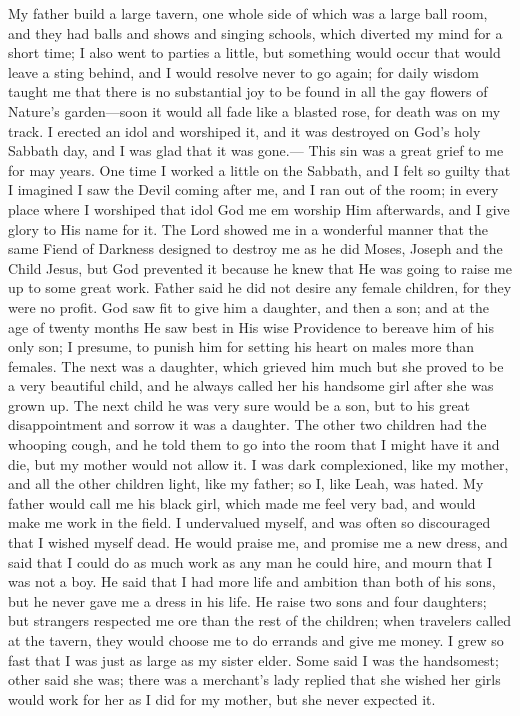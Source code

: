 \documentclass{article}
\renewcommand\footnote[1]{} %
\begin{document}
My father build a large tavern, one whole side of which was a large ball room, and they had balls and shows and singing schools, which diverted my mind for a short time; I also went to parties a little, but something would occur that would leave a sting behind, and I would resolve never to go again; for daily wisdom taught me that there is no substantial joy to be found in all the gay flowers of Nature's garden---soon it would all fade like a blasted rose, for death was on my track.
I erected an idol and worshiped it, and it was destroyed on God's holy Sabbath day, and I was glad that it was gone.---
This sin was a great grief to me for may years.
One time I worked a little on the Sabbath, and I felt so guilty that I imagined I saw the Devil coming after me, and I ran out of the room; in every place where I worshiped that idol God me em worship Him afterwards, and I give glory to His name for it.
The Lord showed me in a wonderful manner that the same Fiend of Darkness designed to destroy me as he did Moses, Joseph and the Child Jesus, but God prevented it because he knew that He was going to raise me up to some great work.
Father said he did not desire any female children, for they were no profit.
God saw fit to give him a daughter\footnote{Harriet Draper, 1796--1834}, and then a son\footnote{Harrison Draper, 1797--1798}; and at the age of twenty months He saw best in His wise Providence to bereave him of his only son; I presume, to punish him for setting his heart on males more than females.
The next was a daughter\footnote{Maria Draper, 1801--1883}, which grieved him much but she proved to be a very beautiful child, and he always called her his handsome girl after she was grown up.
The next child he was very sure would be a son, but to his great disappointment and sorrow it was a daughter\footnote{The Author, Clarissa Draper, 1801--1874}.
The other two children\footnote{Harriet and Maria} had the whooping cough, and he told them to go into the room that I might have it and die, but my mother would not allow it.
I was dark complexioned, like my mother, and all the other children light, like my father; so I, like Leah, was hated.
My father would call me his black girl, which made me feel very bad, and would make me work in the field.
I undervalued myself, and was often so discouraged that I wished myself dead.
He would praise me, and promise me a new dress, and said that I could do as much work as any man he could hire, and mourn that I was not a boy.
He said that I had more life and ambition than both of his sons, but he never gave me a dress in his life.
He raise two sons\footnote{Hiram Draper, 1804--1841; and Aheimas Draper, 1808--1888} and four daughters\footnote{Harriet, Maria, and Clarissa; plus Laura Draper, 1806--1900}; but strangers respected me ore than the rest of the children; when travelers called at the tavern, they would choose me to do errands and give me money.
I grew so fast that I was just as large as my sister elder\footnote{presumably Maria}.
Some said I was the handsomest; other said she was; there was a merchant's lady replied that she wished her girls would work for her as I did for my mother, but she never expected it.
\end{document}
